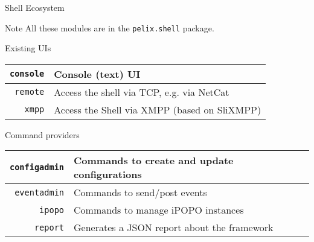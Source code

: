 \begin{frame}{Shell Ecosystem}
\begin{small}
\begin{exampleblock}{Note}
All these modules are in the \texttt{pelix.shell} package.
\end{exampleblock}

\begin{block}{Existing UIs}
\centering
\begin{tabular}{rl}
\texttt{console} & Console (text) UI \\
\hline
\texttt{remote} & Access the shell via TCP, e.g. via NetCat \\
\hline
\texttt{xmpp} & Access the Shell via XMPP (based on SliXMPP) \\
\end{tabular}
\end{block}

\begin{block}{Command providers}
\centering
\begin{tabular}{rl}
\texttt{configadmin} & Commands to create and update configurations \\
\hline
\texttt{eventadmin} & Commands to send/post events \\
\hline
\texttt{ipopo} & Commands to manage iPOPO instances \\
\hline
\texttt{report} & Generates a JSON report about the framework \\
\end{tabular}
\end{block}
\end{small}
\end{frame}
